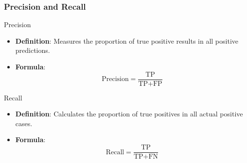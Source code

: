 \documentclass[aspectratio=169]{beamer}
\begin{document}
\begin{frame}[fragile]
    \frametitle{Precision and Recall}
    \begin{block}{Precision}
        \begin{itemize}
            \item \textbf{Definition}: Measures the proportion of true positive results in all positive predictions.
            \item \textbf{Formula}:
            \[
            \text{Precision} = \frac{\text{TP}}{\text{TP} + \text{FP}}
            \]
        \end{itemize}
        \end{block}

        \begin{block}{Recall}
            \begin{itemize}
                \item \textbf{Definition}: Calculates the proportion of true positives in all actual positive cases.
                \item \textbf{Formula}:
                \[
                \text{Recall} = \frac{\text{TP}}{\text{TP} + \text{FN}}
                \]
            \end{itemize}
            \end{block}
\end{frame}
\end{document}
